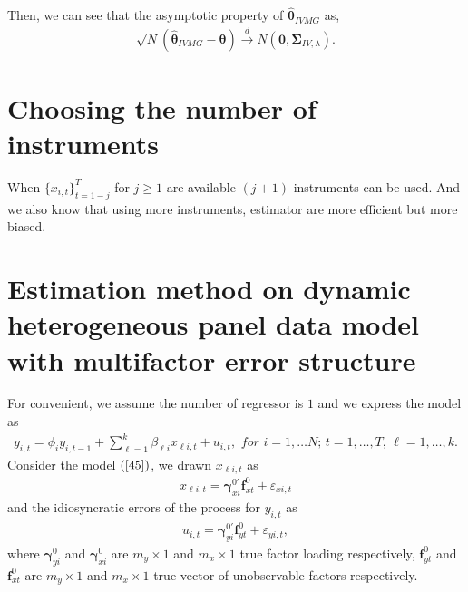 \documentclass[12pt,a4paper,hyperref]{article}
\begin{document}
Then, we can see that the asymptotic property of $\hat{\boldsymbol{\theta}}_{IVMG} $ as,
\begin{align}
\sqrt{N}\left(\hat{\boldsymbol{\theta}}_{IVMG}-\boldsymbol{\theta}  \right)\overset{d}{\to} N\left(\boldsymbol{0},\boldsymbol{\Sigma}_{IV,\lambda} \right).
\end{align}

\section{Choosing the number of instruments}
When $\{ x_{i,t} \}^{T}_{t=1-j}$ for $j \geq 1$ are available $\left( j+1 \right)$ instruments can be used. And we also know that using more instruments, estimator are more efficient but more biased.





\section{Estimation method on dynamic heterogeneous panel data model with  multifactor error structure}
For convenient, we assume the number of regressor is $1$ and we express the model as
\begin{align}
y_{i,t}=\phi_{i} y_{i,t-1}+ \sum^{k}_{\ell=1}\beta_{\ell i}x_{\ell i,t}+u_{i,t}, \,\, for\,\,i=1,\ldots N;\,t=1,\ldots,T, \, \ell=1,\ldots, k. \label{46}
\end{align}
Consider the model $(\ref{45})$, we drawn $x_{\ell i,t}$ as
\begin{align}
x_{\ell i,t}=\boldsymbol{\gamma}^{0'}_{xi}\boldsymbol{f}^{0}_{xt}+\varepsilon_{xi,t}
\end{align}
and the idiosyncratic errors of the process for $y_{i,t}$ as
\begin{align}
u_{i,t}=\boldsymbol{\gamma}^{0'}_{yi}\boldsymbol{f}^{0}_{yt}+\varepsilon_{yi,t},
\end{align}
where $\boldsymbol{\gamma}^{0}_{yi}$ and $\boldsymbol{\gamma}^{0}_{xi}$ are $m_{y}\times 1$ and $m_{x}\times 1$ true
 factor loading respectively, $\boldsymbol{f}^{0}_{yt}$  and  $\boldsymbol{f}^{0}_{xt}$ are  $m_{y}\times 1$ and $m_{x}\times 1$ true vector of unobservable factors respectively.
\end{document}
